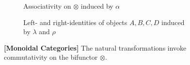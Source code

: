\documentclass[10pt,a4paper,reqno]{amsart}
\numberwithin{figure}{section}
\begin{document}
\begin{figure}[ht]
        \begin{subfigure}{\textwidth}
                \centering
                \caption{Associativity on $\otimes$ induced by $\alpha$}
        \end{subfigure}

        \begin{subfigure}{\textwidth}
                \centering
                \caption{Left- and right-identities of objects $A,B,C,D$ induced
                        by $\lambda$ and $\rho$}
        \end{subfigure}%
        \caption{\textbf{[Monoidal Categories]} The natural transformations
                invoke commutativity on the bifunctor $\otimes$.}
        \vspace{1.5em}
        \label{fig:monoidal-cat-commute}
\end{figure}
\end{document}
